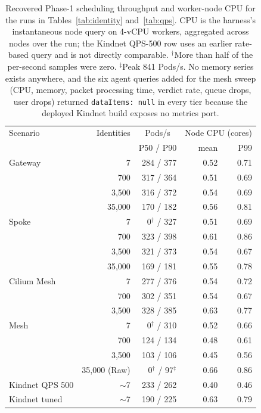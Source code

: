 \begin{table}[t]
\centering
\small
\setlength{\tabcolsep}{3pt}
\begin{tabular}{lrrrr}
\toprule
Scenario & Identities & \multicolumn{1}{c}{Pods/s} & \multicolumn{2}{c}{Node CPU (cores)}\\
 & & P50 / P90 & mean & P99\\
\midrule
Gateway & 7 & 284 / 377 & 0.52 & 0.71\\
 & 700 & 317 / 364 & 0.51 & 0.69\\
 & 3,500 & 316 / 372 & 0.54 & 0.69\\
 & 35,000 & 170 / 182 & 0.56 & 0.81\\
\midrule
Spoke & 7 & 0$^{\dagger}$ / 327 & 0.51 & 0.69\\
 & 700 & 323 / 398 & 0.61 & 0.86\\
 & 3,500 & 321 / 373 & 0.54 & 0.67\\
 & 35,000 & 169 / 181 & 0.55 & 0.78\\
\midrule
Cilium Mesh & 7 & 277 / 376 & 0.54 & 0.72\\
 & 700 & 302 / 351 & 0.54 & 0.67\\
 & 3,500 & 328 / 385 & 0.63 & 0.77\\
\midrule
\sys{} Mesh & 7 & 0$^{\dagger}$ / 310 & 0.52 & 0.66\\
 & 700 & 124 / 134 & 0.48 & 0.61\\
 & 3,500 & 103 / 106 & 0.45 & 0.56\\
 & 35,000 (Raw) & 0$^{\dagger}$ / 97$^{\ddagger}$ & 0.66 & 0.86\\
\midrule
Kindnet QPS 500 & $\sim$7 & 233 / 262 & 0.40 & 0.46\\
Kindnet tuned & $\sim$7 & 190 / 225 & 0.63 & 0.79\\
\bottomrule
\end{tabular}
\caption{Recovered Phase-1 scheduling throughput and worker-node CPU for
the runs in Tables~\ref{tab:identity} and~\ref{tab:qps}. CPU is the
harness's instantaneous node query on 4-vCPU workers, aggregated across
nodes over the run; the Kindnet QPS-500 row uses an earlier rate-based
query and is not directly comparable. $^{\dagger}$More than half of the
per-second samples were zero. $^{\ddagger}$Peak 841 Pods/s. No memory
series exists anywhere, and the six \sys{} agent queries added for the
mesh sweep (CPU, memory, packet processing time, verdict rate, queue
drops, user drops) returned \texttt{dataItems: null} in every tier
because the deployed Kindnet build exposes no metrics port.}
\label{tab:resources}
\end{table}

